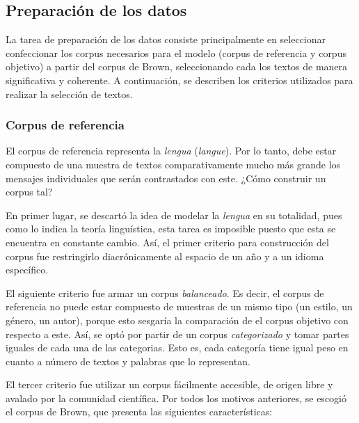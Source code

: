 \documentclass[12pt,letterpaper,twoside]{article}
\begin{document}
\subsection{Preparación de los datos}
\label{sec:orgcef1acb}
\label{sec:preparacion_datos} La tarea de preparación de los datos
consiste principalmente en seleccionar confeccionar los corpus
necesarios para el modelo (corpus de referencia y corpus objetivo)
a partir del corpus de Brown, seleccionando cada los textos de
manera significativa y coherente.  A continuación, se describen los
criterios utilizados para realizar la selección de textos.

\subsubsection{Corpus de referencia}
\label{sec:org1d410ed}

El corpus de referencia representa la \emph{lengua} (\emph{langue}). Por lo
tanto, debe estar compuesto de una muestra de textos
comparativamente mucho más grande los mensajes individuales que
serán contrastados con este. ¿Cómo construir un corpus tal?

En primer lugar, se descartó la idea de modelar la \emph{lengua} en su
totalidad, pues como lo indica la teoría linguística, esta tarea
es imposible puesto que esta se encuentra en constante
cambio. Así, el primer criterio para construcción del corpus fue
restringirlo diacrónicamente al espacio de un año y a un idioma
específico.

El siguiente criterio fue armar un corpus \emph{balanceado}. Es decir,
el corpus de referencia no puede estar compuesto de muestras de
un mismo tipo (un estilo, un género, un autor), porque esto
sesgaría la comparación de el corpus objetivo con respecto a
este. Así, se optó por partir de un corpus \emph{categorizado} y tomar
partes iguales de cada una de las categorias. Esto es, cada
categoría tiene igual peso en cuanto a número de textos y
palabras que lo representan.

El tercer criterio fue utilizar un corpus fácilmente accesible,
de origen libre y avalado por la comunidad científica. Por todos
los motivos anteriores, se escogió el corpus de Brown, que
presenta las siguientes características:
\end{document}
